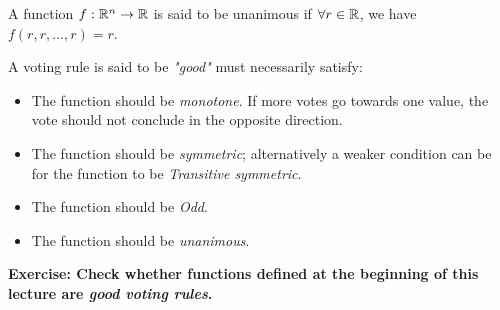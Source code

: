 \begin{definition}
    A function ${f} : {\mathbb{R}^n} \rightarrow {\mathbb{R}}$ is said to be unanimous if $\forall r \in \mathbb{R}$, we have $f(r,r,...,r) = r$.
\end{definition}

\begin{definition}
    A voting rule is said to be \emph{"good"} must necessarily satisfy:
    \begin{itemize}
        \item The function should be \emph{monotone}. If more votes go towards one value, the vote should not conclude in the opposite direction.
        \item The function should be \emph{symmetric}; alternatively a weaker condition can be for the function to be \emph{Transitive symmetric}.
        \item The function should be \emph{Odd}.
        \item The function should be \emph{unanimous}.
    \end{itemize}
\end{definition}

\textbf{Exercise: Check whether functions defined at the beginning of this lecture are \textit{good voting rules}.}

